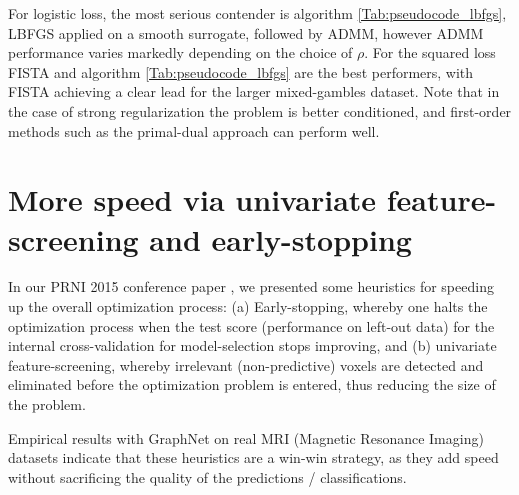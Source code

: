 For logistic loss, the most serious contender is
algorithm \ref{Tab:pseudocode_lbfgs}, LBFGS applied on a smooth
surrogate, followed by ADMM, however ADMM performance
varies markedly depending on the choice of $\rho$. For the squared loss
FISTA and algorithm \ref{Tab:pseudocode_lbfgs} are the best performers,
with FISTA achieving a clear lead for the larger mixed-gambles dataset.
Note that in the case of strong regularization the problem is better
conditioned, and first-order methods such as the
primal-dual approach can perform well.

\section{More speed via univariate feature-screening and early-stopping}
In our PRNI 2015 conference paper   \citep{dohmatob2015speeding}, we presented some heuristics for speeding up the overall optimization process: (a) Early-stopping, whereby one  halts
the optimization process when the test score (performance on left-out
data) for the internal cross-validation for model-selection stops
improving, and (b) univariate feature-screening, whereby irrelevant
(non-predictive) voxels are detected and eliminated before the
optimization problem is entered, thus reducing the size of the
problem.

Empirical results with GraphNet on real MRI (Magnetic
Resonance Imaging)
datasets indicate that these heuristics are a win-win strategy, as
they add speed without sacrificing the quality of the predictions
/ classifications.

